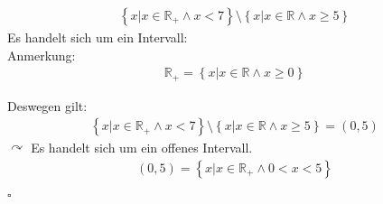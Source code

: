 \begin{eqnarray}
	\left\{x \vert x \in \mathbb{R}_{+} \land x < 7 \right\} \setminus \left\{ x \vert x \in \mathbb{R}  \land x \ge 5\right\} 
\end{eqnarray}
Es handelt sich um ein Intervall:\\

Anmerkung:\\
\begin{eqnarray}
	 \mathbb{R}_{+} = \left\{x \vert x \in \mathbb{R} \land x  \ge 0 \right\}
\end{eqnarray}


Deswegen gilt: \\

\begin{eqnarray}
	\left\{x \vert x \in \mathbb{R}_{+} \land x < 7 \right\} \setminus \left\{ x \vert x \in \mathbb{R}  \land x \ge 5\right\} =  \left(0,5 \right)
\end{eqnarray}
$\curvearrowright$ Es handelt sich um ein offenes Intervall.\\

\begin{eqnarray}
\left(0,5 \right) = \left\{ x | x \in \mathbb{R}_{+} \land 0<x<5 \right\}
\end{eqnarray}

$\square$